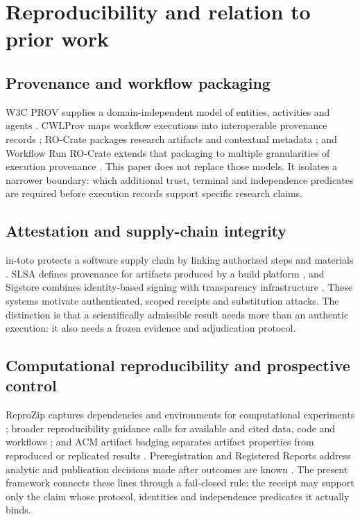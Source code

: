 \section{Reproducibility and relation to prior work}

\subsection{Provenance and workflow packaging}

W3C PROV supplies a domain-independent model of entities, activities and agents
\citep{moreau2013prov}. CWLProv maps workflow executions into interoperable
provenance records \citep{khan2019cwlprov}; RO-Crate packages research artifacts
and contextual metadata \citep{soilandreyes2022rocrate}; and Workflow Run RO-Crate
extends that packaging to multiple granularities of execution provenance
\citep{leo2024workflowrun}. This paper does not replace those models. It isolates a
narrower boundary: which additional trust, terminal and independence predicates
are required before execution records support specific research claims.

\subsection{Attestation and supply-chain integrity}

in-toto protects a software supply chain by linking authorized steps and materials
\citep{torresarias2019intoto}. SLSA defines provenance for artifacts produced by a
build platform \citep{slsa2026provenance}, and Sigstore combines identity-based
signing with transparency infrastructure \citep{sigstore2026signing}. These systems
motivate authenticated, scoped receipts and substitution attacks. The distinction
is that a scientifically admissible result needs more than an authentic execution:
it also needs a frozen evidence and adjudication protocol.

\subsection{Computational reproducibility and prospective control}

ReproZip captures dependencies and environments for computational experiments
\citep{chirigati2016reprozip}; broader reproducibility guidance calls for available
and cited data, code and workflows \citep{stodden2016enhancing}; and ACM artifact
badging separates artifact properties from reproduced or replicated results
\citep{acm2020badging}. Preregistration and Registered Reports address analytic and
publication decisions made after outcomes are known
\citep{nosek2018preregistration,chambers2015registered}. The present framework
connects these lines through a fail-closed rule: the receipt may support only the
claim whose protocol, identities and independence predicates it actually binds.

